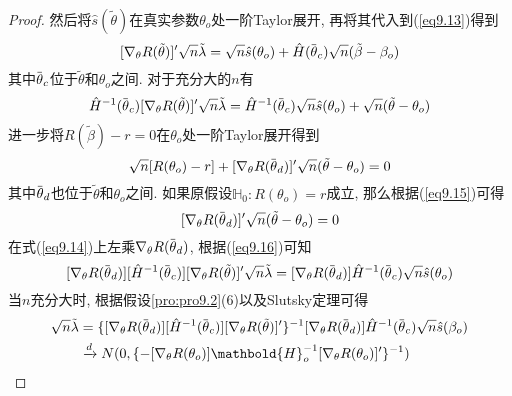 \documentclass[cn, 12pt, math=mtpro2, bibstyle=apa, blue, twocol]{elegantbook}
\newcommand{\HH}{\mathbb{H}}
\newcommand{\overbar}[1]{\mkern 1.5mu\overline{\mkern-1.5mu#1\mkern-1.5mu}\mkern 1.5mu}
\begin{document}
\begin{proof}
  然后将$\hat{s}(\tilde{\theta})$在真实参数$\theta_o$处一阶Taylor展开, 再将其代入到(\ref{eq9.13})得到
  $$[\nabla_\theta R(\tilde{\theta})]'\sqrt{n}\tilde{\lambda}=\sqrt{n}\hat{s}(\theta_o)+\hat{H}(\overbar{\theta}_c)\sqrt{n}(\tilde{\beta}-\beta_o)$$
  其中$\overbar{\theta}_c$位于$\tilde{\theta}$和$\theta_o$之间. 对于充分大的$n$有
  \begin{equation}\label{eq9.14}
    \hat{H}^{-1}(\overbar{\theta}_c)[\nabla_\theta R(\tilde{\theta})]'\sqrt{n}\tilde{\lambda}=\hat{H}^{-1}(\overbar{\theta}_c)\sqrt{n}\hat{s}(\theta_o)+\sqrt{n}(\tilde{\theta}-\theta_o)
  \end{equation}
  进一步将$R(\tilde{\beta})-r=0$在$\theta_o$处一阶Taylor展开得到
  \begin{equation}\label{eq9.15}
    \sqrt{n}[R(\theta_o)-r]+[\nabla_\theta R(\overbar{\theta}_d)]'\sqrt{n}(\tilde{\theta}-\theta_o)=0
  \end{equation}
  其中$\overbar{\theta}_d$也位于$\tilde{\theta}$和$\theta_o$之间. 如果原假设$\HH_0: R(\theta_o)=r$成立, 那么根据(\ref{eq9.15})可得
  \begin{equation}\label{eq9.16}
    [\nabla_\theta R(\overbar{\theta}_d)]'\sqrt{n}(\tilde{\theta}-\theta_o)=0
  \end{equation}
  在式(\ref{eq9.14})上左乘$\nabla_\theta R(\overbar{\theta}_d)$, 根据(\ref{eq9.16})可知
  $$[\nabla_\theta R(\overbar{\theta}_d)][\hat{H}^{-1}(\overbar{\theta}_c)][\nabla_\theta R(\tilde{\theta})]'\sqrt{n}\tilde{\lambda}=[\nabla_\theta R(\overbar{\theta}_d)]\hat{H}^{-1}(\overbar{\theta}_c)\sqrt{n}\hat{s}(\theta_o)$$
  当$n$充分大时, 根据假设\ref{pro:pro9.2}(6)以及Slutsky定理可得
  \begin{align}
  \sqrt{n}\tilde{\lambda}&=\{[\nabla_\theta R(\overbar{\theta}_d)][\hat{H}^{-1}(\overbar{\theta}_c)][\nabla_\theta R(\tilde{\theta})]'\}^{-1}[\nabla_\theta R(\overbar{\theta}_d)]\hat{H}^{-1}(\overbar{\theta}_c)\sqrt{n}\hat{s}(\beta_o) \nonumber \\
  &\xrightarrow{d}N(0,\{-[\nabla_\theta R(\theta_o)]\mathbold{H}_o^{-1}[\nabla_\theta R(\theta_o)]'\}^{-1}) \label{eq9.18}
  \end{align}


\end{proof}
\end{document}

